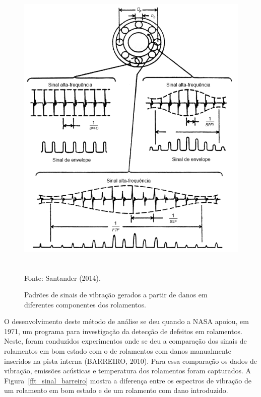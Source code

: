 \documentclass[
	12pt,				
	oneside,			
	a4paper,			
	english,			
	brazil,			
	]{abntex2ppgsi}
\begin{document}
\begin{figure}[!htb]
\centering
\caption {Padrões de sinais de vibração gerados a partir de danos em diferentes componentes dos rolamentos.}
\includegraphics[width=\textwidth,height=150mm,keepaspectratio]{frequencias_sinais_rolamentos} \\
Fonte: Santander (2014).
\label{frequencias_sinais_rolamentos}
\end{figure}

O desenvolvimento deste método de análise se deu quando a NASA apoiou, em 1971, um programa para investigação da detecção de defeitos em rolamentos. Neste, foram conduzidos experimentos onde se deu a comparação dos sinais de rolamentos em bom estado com o de rolamentos com danos manualmente inseridos na pista interna (BARREIRO, 2010). Para essa comparação os dados de vibração, emissões acústicas e temperatura dos rolamentos foram capturados. A Figura~\ref{fft_sinal_barreiro} mostra a diferença entre os espectros de vibração de um rolamento em bom estado e de um rolamento com dano introduzido.
\end{document}
